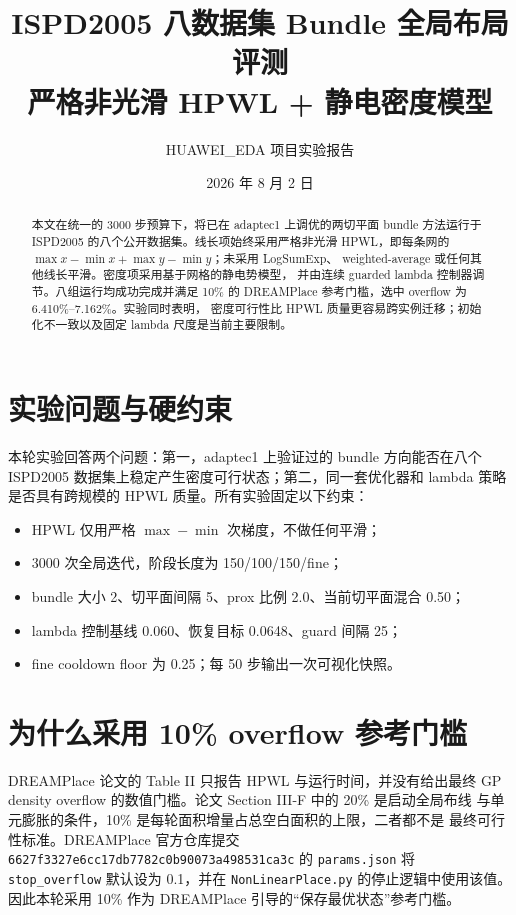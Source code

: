 \documentclass[11pt,a4paper]{ctexart}
\title{ISPD2005 八数据集 Bundle 全局布局评测\\
\large 严格非光滑 HPWL + 静电密度模型}
\author{HUAWEI\_EDA 项目实验报告}
\date{2026 年 8 月 2 日}
\begin{document}
\maketitle

\begin{abstract}
本文在统一的 3000 步预算下，将已在 adaptec1 上调优的两切平面 bundle
方法运行于 ISPD2005 的八个公开数据集。线长项始终采用严格非光滑
HPWL，即每条网的 $\max x-\min x+\max y-\min y$；未采用 LogSumExp、
weighted-average 或任何其他线长平滑。密度项采用基于网格的静电势模型，
并由连续 guarded lambda 控制器调节。八组运行均成功完成并满足 10\% 的
DREAMPlace 参考门槛，选中 overflow 为 6.410\%--7.162\%。实验同时表明，
密度可行性比 HPWL 质量更容易跨实例迁移；初始化不一致以及固定 lambda
尺度是当前主要限制。
\end{abstract}

\section{实验问题与硬约束}

本轮实验回答两个问题：第一，adaptec1 上验证过的 bundle 方向能否在八个
ISPD2005 数据集上稳定产生密度可行状态；第二，同一套优化器和 lambda
策略是否具有跨规模的 HPWL 质量。所有实验固定以下约束：
\begin{itemize}
  \item HPWL 仅用严格 $\max-\min$ 次梯度，不做任何平滑；
  \item 3000 次全局迭代，阶段长度为 150/100/150/fine；
  \item bundle 大小 2、切平面间隔 5、prox 比例 2.0、当前切平面混合 0.50；
  \item lambda 控制基线 0.060、恢复目标 0.0648、guard 间隔 25；
  \item fine cooldown floor 为 0.25；每 50 步输出一次可视化快照。
\end{itemize}

\section{为什么采用 10\% overflow 参考门槛}

DREAMPlace 论文的 Table II 只报告 HPWL 与运行时间，并没有给出最终 GP
density overflow 的数值门槛。论文 Section III-F 中的 20\% 是启动全局布线
与单元膨胀的条件，10\% 是每轮面积增量占总空白面积的上限，二者都不是
最终可行性标准。DREAMPlace 官方仓库提交
\texttt{6627f3327e6cc17d\allowbreak b7782c0b90073a49\allowbreak 8531ca3c} 的
\texttt{params.json} 将 \texttt{stop\_overflow} 默认设为 0.1，并在
\texttt{NonLinearPlace.py} 的停止逻辑中使用该值。因此本轮采用 10\%
作为 DREAMPlace 引导的“保存最优状态”参考门槛。
\end{document}
